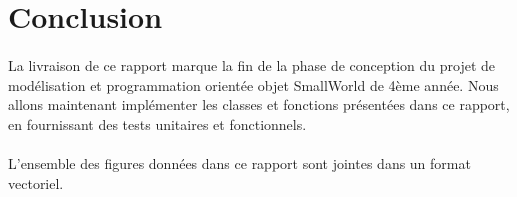 \section*{Conclusion}

\paragraph{}
La livraison de ce rapport marque la fin de la phase de conception du projet de modélisation et programmation orientée objet SmallWorld de 4ème année.
Nous allons maintenant implémenter les classes et fonctions présentées dans ce rapport, en fournissant des tests unitaires et fonctionnels.

\paragraph{}
L'ensemble des figures données dans ce rapport sont jointes dans un format vectoriel.
